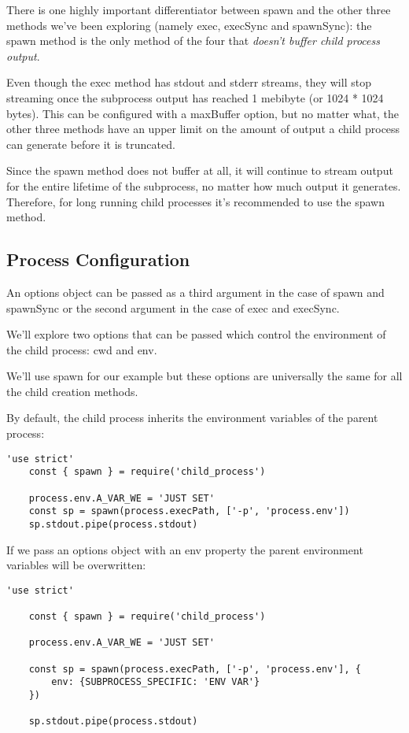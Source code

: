 \documentclass{scrartcl}
\begin{document}
There is one highly important differentiator between spawn and the other three methods we've been exploring (namely exec, execSync and spawnSync): the spawn method is the only method of the four that\textit{ doesn't buffer child process output}.

Even though the exec method has stdout and stderr streams, they will stop streaming once the subprocess output has reached 1 mebibyte (or 1024 * 1024 bytes). This can be configured with a maxBuffer option, but no matter what, the other three methods have an upper limit on the amount of output a child process can generate before it is truncated.

Since the spawn method does not buffer at all, it will continue to stream output for the entire lifetime of the subprocess, no matter how much output it generates. Therefore, for long running child processes it's recommended to use the spawn method.

\subsection{Process Configuration}

An options object can be passed as a third argument in the case of spawn and spawnSync or the second argument in the case of exec and execSync.

We'll explore two options that can be passed which control the environment of the child process: cwd and env.

We'll use spawn for our example but these options are universally the same for all the child creation methods.

By default, the child process inherits the environment variables of the parent process:

\begin{lstlisting}[style=ES6]
    'use strict'
    const { spawn } = require('child_process')

    process.env.A_VAR_WE = 'JUST SET'
    const sp = spawn(process.execPath, ['-p', 'process.env'])
    sp.stdout.pipe(process.stdout)
\end{lstlisting}

If we pass an options object with an env property the parent environment variables will be overwritten:

\begin{lstlisting}[style=ES6]
    'use strict'

    const { spawn } = require('child_process')

    process.env.A_VAR_WE = 'JUST SET'

    const sp = spawn(process.execPath, ['-p', 'process.env'], {
        env: {SUBPROCESS_SPECIFIC: 'ENV VAR'}
    })

    sp.stdout.pipe(process.stdout)
\end{lstlisting}
\end{document}
